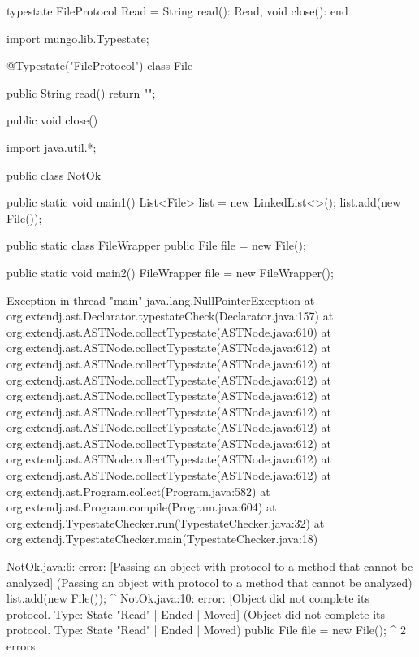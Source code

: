 \begin{code}
typestate FileProtocol {
  Read = {
    String read(): Read,
    void close(): end
  }
}\end{code}

\begin{code}
import mungo.lib.Typestate;

@Typestate("FileProtocol")
class File {

  public String read() {
    return "";
  }

  public void close() {
  }

}\end{code}

\begin{code}
import java.util.*;

public class NotOk {
  public static void main1() {
    List<File> list = new LinkedList<>();
    list.add(new File());
  }
  
  public static class FileWrapper {
    public File file = new File();
  }
  
  public static void main2() {
    FileWrapper file = new FileWrapper();
  }
}\end{code}

\lstset{language=,caption=Mungo's output}
\begin{code}
Exception in thread "main" java.lang.NullPointerException
	at org.extendj.ast.Declarator.typestateCheck(Declarator.java:157)
	at org.extendj.ast.ASTNode.collectTypestate(ASTNode.java:610)
	at org.extendj.ast.ASTNode.collectTypestate(ASTNode.java:612)
	at org.extendj.ast.ASTNode.collectTypestate(ASTNode.java:612)
	at org.extendj.ast.ASTNode.collectTypestate(ASTNode.java:612)
	at org.extendj.ast.ASTNode.collectTypestate(ASTNode.java:612)
	at org.extendj.ast.ASTNode.collectTypestate(ASTNode.java:612)
	at org.extendj.ast.ASTNode.collectTypestate(ASTNode.java:612)
	at org.extendj.ast.ASTNode.collectTypestate(ASTNode.java:612)
	at org.extendj.ast.ASTNode.collectTypestate(ASTNode.java:612)
	at org.extendj.ast.ASTNode.collectTypestate(ASTNode.java:612)
	at org.extendj.ast.Program.collect(Program.java:582)
	at org.extendj.ast.Program.compile(Program.java:604)
	at org.extendj.TypestateChecker.run(TypestateChecker.java:32)
	at org.extendj.TypestateChecker.main(TypestateChecker.java:18)
\end{code}

\lstset{language=,caption=Our tool's output}
\begin{code}
NotOk.java:6: error: [Passing an object with protocol to a method that cannot be analyzed] (Passing an object with protocol to a method that cannot be analyzed)
    list.add(new File());
             ^
NotOk.java:10: error: [Object did not complete its protocol. Type: State "Read" | Ended | Moved] (Object did not complete its protocol. Type: State "Read" | Ended | Moved)
    public File file = new File();
                ^
2 errors
\end{code}

